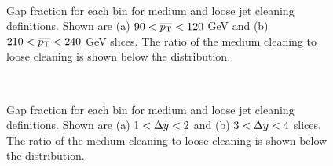 \begin{figure}
\centering
\mbox{
              \quad
              \quad
                              }
\caption[Effect of jet cleaning on the gap fraction versus \ptb{}]{
Gap fraction for each \dy{} bin for medium and loose jet cleaning definitions. 
Shown are (a) $90<\mbox{$\overline{p_{\rm T}}$}{}<120$ GeV and (b)$210<\mbox{$\overline{p_{\rm T}}$}{}<240$ GeV slices.
The ratio of the medium cleaning to loose cleaning is shown below the distribution.
\label{JetCleanGF_dy}}
\end{figure}


\begin{figure}
\centering
\mbox{
              \quad
              \quad
                              }
\caption[Effect of jet cleaning on the gap fraction versus \dy{}]{
Gap fraction for each \ptb{} bin for medium and loose jet cleaning definitions. 
Shown are (a) $1<\mbox{$\Delta y$}{}<2$ and (b) $3<\mbox{$\Delta y$}{}<4$ slices.
The ratio of the medium cleaning to loose cleaning is shown below the distribution.
\label{JetCleanGF_pt}}
\end{figure}




